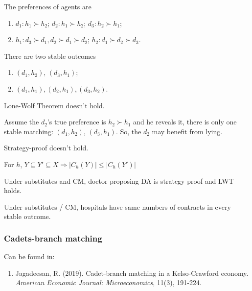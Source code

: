 \documentclass[11pt]{elegantbook}
\begin{document}
\begin{example} The preferences of agents are
    \begin{enumerate}[$\circ$]
        \item $d_1: h_1\succ h_2$; $d_2: h_1\succ h_2$; $d_3: h_2\succ h_1$;
        \item $h_1: d_3\succ d_1,d_2\succ d_1\succ d_2$; $h_2: d_1\succ d_2\succ d_3$.
    \end{enumerate}
    There are two stable outcomes
    \begin{enumerate}
        \item $(d_1,h_2)$, $(d_3,h_1)$;
        \item $(d_1,h_1), (d_2,h_1), (d_3,h_2)$.
    \end{enumerate}
    \begin{remark}
        Lone-Wolf Theorem doesn't hold.
    \end{remark}

    Assume the $d_2$'s true preference is $h_2\succ h_1$ and he reveals it, there is only one stable matching: $(d_1,h_2)$, $(d_3,h_1)$. So, the $d_2$ may benefit from lying.\\
    \begin{remark}
        Strategy-proof doesn't hold.
    \end{remark}
\end{example}

\begin{definition}
    \normalfont
    For $h$, $Y\subseteq Y'\subseteq X \Rightarrow |C_h(Y)|\leq |C_h(Y')|$
\end{definition}

\begin{theorem}
    Under substitutes and CM, doctor-proposing DA is strategy-proof and LWT holds.
\end{theorem}

\begin{theorem}
    Under substitutes / CM, hospitals have same numbers of contracts in every stable outcome.
\end{theorem}

\subsubsection*{Cadets-branch matching}
Can be found in:
\begin{enumerate}[$\circ$]
    \item Jagadeesan, R. (2019). Cadet-branch matching in a Kelso-Crawford economy. \textit{American Economic Journal: Microeconomics}, 11(3), 191-224.
\end{enumerate}
\end{document}
